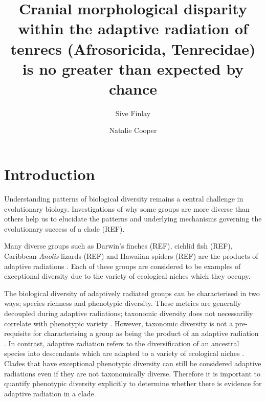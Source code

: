 \documentclass[12pt,a4paper]{article}
\begin{document}
\title{Cranial morphological disparity within the adaptive radiation of tenrecs (Afrosoricida, Tenrecidae) is no greater than expected by chance} 


\author[1,2,*]{Sive Finlay}
\author[1,2]{Natalie Cooper}

\maketitle


\begin{abstract}


\end{abstract}

\section{Introduction}

Understanding patterns of biological diversity remains a central challenge in evolutionary biology. Investigations of why some groups are more diverse than others help us to elucidate the patterns and underlying mechanisms governing the evolutionary success of a clade (REF). 

Many diverse groups such as Darwin's finches (REF), cichlid fish (REF), Caribbean \textit{Anolis} lizards (REF) and Hawaiian spiders (REF) are the products of adaptive radiations \citep{Losos2010}. Each of these groups are considered to be examples of exceptional diversity due to the variety of ecological niches which they occupy. 

The biological diversity of adaptively radiated groups can be characterised in two ways; species richness and phenotypic diversity. These metrics are generally decoupled during adaptive radiations; taxonomic diversity does not necessariliy correlate with phenotypic variety \citep{Ruta2013, Hopkins2013}. 
However, taxonomic diversity is not a pre-requisite for characterising a group as being the product of an adaptive radiation \citep{Losos2010}. In contrast, adaptive radiation refers to the diversification of an ancestral species into descendants which are adapted to a variety of ecological niches \citep{Losos2010a}. Clades that have exceptional phenotypic diversity can still be considered adaptive radiations even if they are not taxonomically diverse. Therefore it is important to quantify phenotypic diversity explicitly to determine whether there is evidence for adaptive radiation in a clade.
\end{document}
